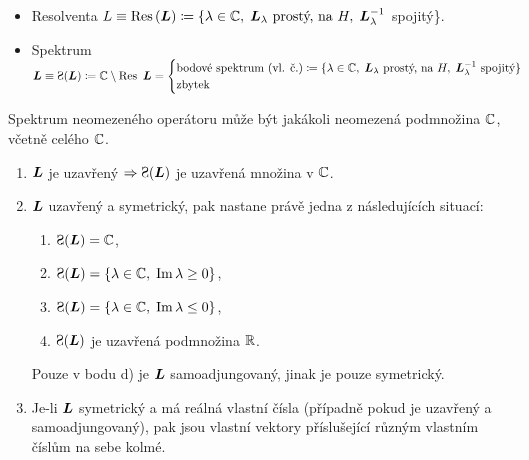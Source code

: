 \begin{definition} \qquad
\begin{itemize}
    \item Resolventa $L\equiv \operatorname{Res}\,(\boldsymbol{L}) \coloneqq \{ \lambda\in \mathbb{C},\;\boldsymbol{L}_{\lambda} \text{ prostý, na }H,\;\boldsymbol{L}_\lambda^{-1}$ spojitý\}.
    \item Spektrum $\map L\equiv \Sp(\map L) \coloneqq \C \setminus \Res\, \map L = \begin{cases}
\text{bodové spektrum (vl. č.)} \coloneqq \{\lambda\in\C,\;\map L_\lambda \text{ prostý, na } H,\; \map L_\lambda^{-1} \text{ spojitý}\}\\
\text{zbytek}
\end{cases}$
\end{itemize}
\end{definition}

\begin{remark}
Spektrum neomezeného operátoru může být jakákoli neomezená podmnožina $\mathbb{C}$, včetně celého $\mathbb{C}$.
\end{remark}

\begin{enumerate}
    \item $\boldsymbol{L}$ je uzavřený $\Rightarrow \Sp(\map L)$ je uzavřená množina v $\mathbb{C}$.
    \item $\boldsymbol{L}$ uzavřený a symetrický, pak nastane právě jedna z následujících situací: \begin{enumerate}
        \item $\Sp(\map L) = \C$,
        \item $\Sp(\map L) = \{ \lambda \in \C,\; \mathrm{Im}\, \lambda \geq 0 \}$,
         \item $\Sp(\map L) = \{ \lambda \in \C,\; \mathrm{Im} \, \lambda \leq 0 \}$,
          \item $\Sp(\map L)$ je uzavřená podmnožina $\mathbb{R}$.
    \end{enumerate}
    Pouze v bodu d) je $\boldsymbol{L}$ samoadjungovaný, jinak je pouze symetrický.
    \item Je-li $\boldsymbol{L}$ symetrický a má reálná vlastní čísla (případně pokud je uzavřený a samoadjungovaný), pak jsou vlastní vektory příslušející různým vlastním číslům na sebe kolmé.
\end{enumerate}


